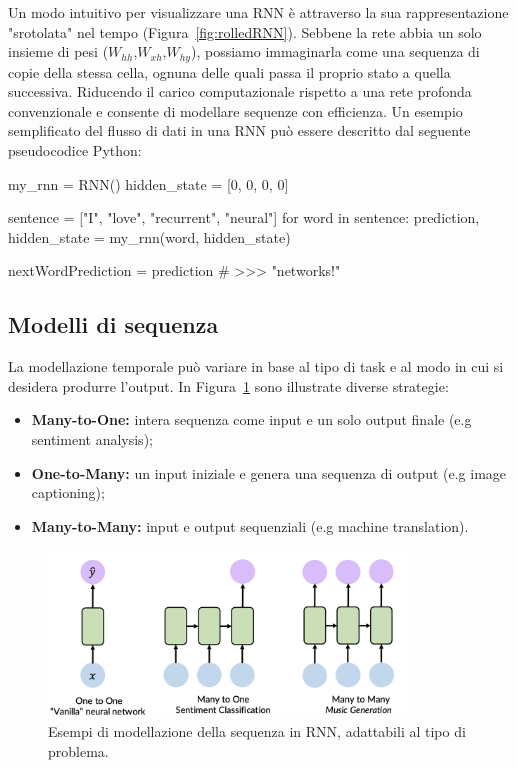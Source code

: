 Un modo intuitivo per visualizzare una RNN è attraverso la sua rappresentazione "srotolata" nel tempo (Figura~\ref{fig:rolledRNN}). Sebbene la rete abbia un solo insieme di pesi ($W_{hh}$,$W_{xh}$,$W_{hy}$), possiamo immaginarla come una sequenza di copie della stessa cella, ognuna delle quali passa il proprio stato a quella successiva. Riducendo il carico computazionale rispetto a una rete profonda convenzionale e consente di modellare sequenze con efficienza. Un esempio semplificato del flusso di dati in una RNN può essere descritto dal seguente pseudocodice Python:
\vspace{0.5em}
\begin{python}
    my_rnn = RNN()
    hidden_state = [0, 0, 0, 0]

    sentence = ["I", "love", "recurrent", "neural"]
    for word in sentence:
        prediction, hidden_state = my_rnn(word, hidden_state)

    nextWordPrediction = prediction
    # >>> "networks!"
\end{python}
\vspace{0.5em}

\subsection{Modelli di sequenza}    
La modellazione temporale può variare in base al tipo di task e al modo in cui si desidera produrre l'output. In Figura~\ref{fig:seqMod} sono illustrate diverse strategie:

\begin{itemize}
    \item \textbf{Many-to-One:} intera sequenza come input e un solo output finale (e.g sentiment analysis);
    \item \textbf{One-to-Many:} un input iniziale e genera una sequenza di output (e.g image captioning);
    \item \textbf{Many-to-Many:} input e output sequenziali (e.g machine translation).
\end{itemize}

\begin{figure}
    \centering
    \includegraphics[width=0.85\textwidth]{figure/SequenceModeling.png}
    \caption{Esempi di modellazione della sequenza in RNN, adattabili al tipo di problema.}
    \label{fig:seqMod}
\end{figure}

